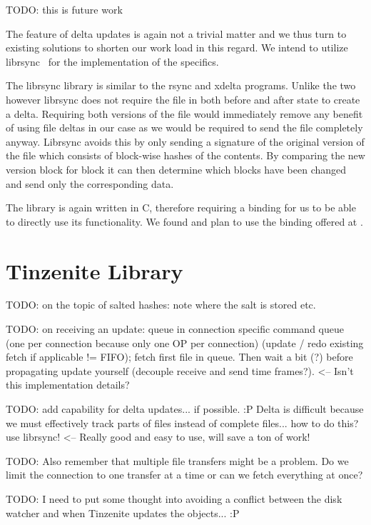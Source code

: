 TODO: this is future work

The feature of delta updates is again not a trivial matter and we thus turn to existing solutions to shorten our work load in this regard.
We intend to utilize librsync~\cite{web:site:librsync} for the implementation of the specifics.

The librsync library is similar to the rsync and xdelta programs.
Unlike the two however librsync does not require the file in both before and after state to create a delta.
Requiring both versions of the file would immediately remove any benefit of using file deltas in our case as we would be required to send the file completely anyway.
Librsync avoids this by only sending a signature of the original version of the file which consists of block-wise hashes of the contents.
By comparing the new version block for block it can then determine which blocks have been changed and send only the corresponding data.

The library is again written in C, therefore requiring a binding for us to be able to directly use its functionality.
We found and plan to use the binding offered at \cite{web:site:librsync:golang}.

\section{Tinzenite Library}

TODO: on the topic of salted hashes: note where the salt is stored etc.

TODO: on receiving an update: queue in connection specific command queue (one per connection because only one OP per connection) (update / redo existing fetch if applicable != FIFO); fetch first file in queue.
Then wait a bit (?) before propagating update yourself (decouple receive and send time frames?). <-- Isn't this implementation details?

TODO: add capability for delta updates... if possible. :P
Delta is difficult because we must effectively track parts of files instead of complete files... how to do this?
use librsync! <-- Really good and easy to use, will save a ton of work!

TODO: Also remember that multiple file transfers might be a problem.
Do we limit the connection to one transfer at a time or can we fetch everything at once?

TODO: I need to put some thought into avoiding a conflict between the disk watcher and when Tinzenite updates the objects... :P

